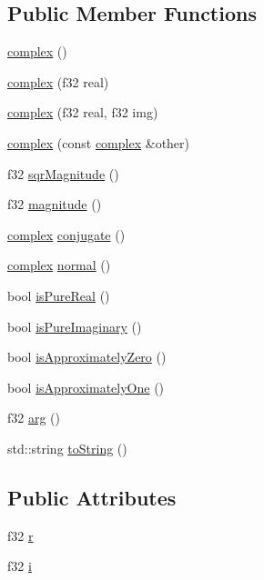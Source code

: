 \subsection*{Public Member Functions}
\begin{DoxyCompactItemize}
\item 
\hyperlink{classqlib_1_1math_1_1complex_ab644fd7573e2bdbbfc02cf95b3fcdf62}{complex} ()
\item 
\hyperlink{classqlib_1_1math_1_1complex_a0eeea99f7c7d4a8e072f6c4836379ed0}{complex} (f32 real)
\item 
\hyperlink{classqlib_1_1math_1_1complex_a0dd3216eb1b24c906b394e67c59adda1}{complex} (f32 real, f32 img)
\item 
\hyperlink{classqlib_1_1math_1_1complex_ab1471e90345a25e6d112216f1a634290}{complex} (const \hyperlink{classqlib_1_1math_1_1complex}{complex} \&other)
\item 
f32 \hyperlink{classqlib_1_1math_1_1complex_ad1a8ab1ad95a47206e72d3a0d7be9511}{sqr\+Magnitude} ()
\item 
f32 \hyperlink{classqlib_1_1math_1_1complex_a8b365d2760802f1318e02c78c8938d2f}{magnitude} ()
\item 
\hyperlink{classqlib_1_1math_1_1complex}{complex} \hyperlink{classqlib_1_1math_1_1complex_a2cfd8546410a48d0568996e40beb85ce}{conjugate} ()
\item 
\hyperlink{classqlib_1_1math_1_1complex}{complex} \hyperlink{classqlib_1_1math_1_1complex_a088dcd1f0349632d0930177e95aa4729}{normal} ()
\item 
bool \hyperlink{classqlib_1_1math_1_1complex_a7a670edef0db4264e211e68aea71f0ec}{is\+Pure\+Real} ()
\item 
bool \hyperlink{classqlib_1_1math_1_1complex_a4465bc164fe2b490c917fc9321530ebb}{is\+Pure\+Imaginary} ()
\item 
bool \hyperlink{classqlib_1_1math_1_1complex_ad5adb1ac3219404c6abcae92800e839d}{is\+Approximately\+Zero} ()
\item 
bool \hyperlink{classqlib_1_1math_1_1complex_a8dfe4186bdf623e30b1cccb1d0b68951}{is\+Approximately\+One} ()
\item 
f32 \hyperlink{classqlib_1_1math_1_1complex_a760122d26f377b008e129ff92b134a43}{arg} ()
\item 
std\+::string \hyperlink{classqlib_1_1math_1_1complex_afd24fadb21a07815675481b131398cff}{to\+String} ()
\end{DoxyCompactItemize}
\subsection*{Public Attributes}
\begin{DoxyCompactItemize}
\item 
f32 \hyperlink{classqlib_1_1math_1_1complex_aceb455ba091019bbd625fdaf529a0107}{r}
\item 
f32 \hyperlink{classqlib_1_1math_1_1complex_a4d599b5885fd37c300cdb79433356bb5}{i}
\end{DoxyCompactItemize}


